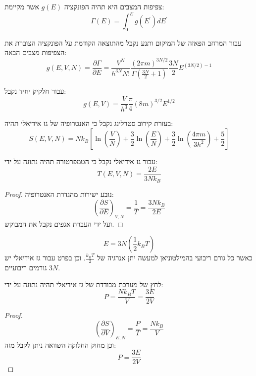 \documentclass{tstextbook}
\begin{document}
\begin{corollary}
צפיפות המצבים היא תהיה הפונקציה \(g(E)\) אשר מקיימת:
$$\Gamma(E)=\int_{0}^{E}g\left( E^{\prime} \right)d E^{\prime}$$

\end{corollary}
\begin{corollary}
עבור המרחב הפאזה של המיקום ותנע נקבל מהתוצאה הקודמת על הפונקציה הצוברת את הצפיפות מצבים הבאה:
$$g(E,V,N)=\frac{\partial \Gamma}{\partial E} =\frac{V^{N}}{h^{3N}N!}\frac{\left( 2\pi m \right)^{3N/2}}{\Gamma\left( \frac{3N}{2}+1 \right)}\frac{3N}{2}E^{(3N/2)-1}$$

\end{corollary}
\begin{example}
עבור חלקיק יחיד נקבל:
$$g(E,V)=\frac{V}{h^{3}}\frac{\pi}{4}(8m)^{3/2}E^{1/2}$$

\end{example}
\begin{proposition}
בעזרת קירוב סטרלינג נקבל כי האנטרופיה של גז אידיאלי תהיה:
$$S(E,V,N)=N k_{B}\left[\ln\left(\frac{V}{N}\right)+\frac{3}{2}\ln\left(\frac{E}{N}\right)+\frac{3}{2}\ln\left(\frac{4\pi m}{3h^{2}}\right)+\frac{5}{2}\right]$$

\end{proposition}
\begin{proposition}
עבור גז אידיאלי נקבל כי הטמפרטורה תהיה נתונה על ידי:
$$T(E,V,N)={\frac{2E}{3N k_{B}}}$$

\end{proposition}
\begin{proof}
נובע ישירות מהגדרת האנטרופיה:
$$\left({\frac{\partial S}{\partial E}}\right)_{V,N}\!\!\!={\frac{1}{T}}={\frac{3N k_{B}}{2E}}$$
ועל ידי העברת אגפים נקבל את המבוקש.

\end{proof}
\begin{corollary}
$$E=3N\left({\frac{1}{2}}k_{B}T\right)$$
כאשר כל גורם ריבועי בהמילטוניאן למעשה יתן אנרגיה של \(\frac{k_{B}T}{2}\). וכן בפרט עבור גז אידיאלי יש \(3N\) גורמים ריבועיים.

\end{corollary}
\begin{proposition}
לחץ של מערכת מבודדת של גז אידיאלי תהיה נתונה על ידי:
$$P={\frac{N k_{B}T}{V}} = \frac{3E}{2V}$$

\end{proposition}
\begin{proof}
$$\left(\frac{\partial S}{\partial V}\right)_{E,N}=\frac{P}{T}=\frac{N k_{B}}{V}$$
וכן מחוק החלוקה השוואה ניתן לקבל מזה:
$$P=\frac{3E}{2V}$$

\end{proof}
\end{document}
